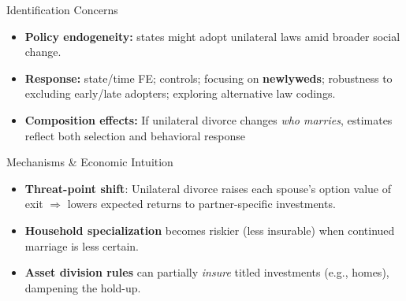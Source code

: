 \documentclass[11pt,notes=hide,aspectratio=169,mathserif]{beamer}
\begin{document}

\begin{frame}{Identification Concerns}
\small
\begin{itemize}
  \item \textbf{Policy endogeneity:} states might adopt unilateral laws amid broader social change.
  \item \textbf{Response:} state/time FE; controls; focusing on \textbf{newlyweds}; robustness to excluding early/late adopters; exploring alternative law codings.
  \item \textbf{Composition effects:} If unilateral divorce changes \emph{who marries}, estimates reflect both selection and behavioral response
\end{itemize}
\end{frame}

\begin{frame}{Mechanisms \& Economic Intuition}
\small
\begin{itemize}
  \item \textbf{Threat-point shift}: Unilateral divorce raises each spouse’s option value of exit $\Rightarrow$ lowers expected returns to partner-specific investments.
  \item \textbf{Household specialization} becomes riskier (less insurable) when continued marriage is less certain.
  \item \textbf{Asset division rules} can partially \emph{insure} titled investments (e.g., homes), dampening the hold-up.
\end{itemize}
\end{frame}
\end{document}

